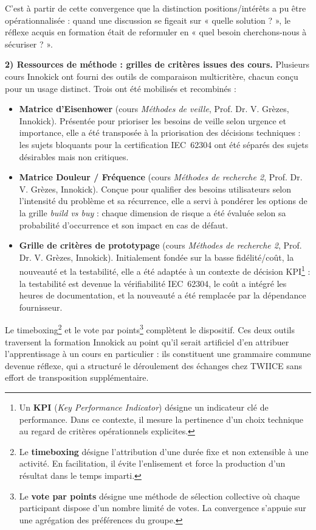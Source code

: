 C'est à partir de cette convergence que la distinction positions/intérêts a pu être opérationnalisée : quand une discussion se figeait sur « quelle solution ? », le réflexe acquis en formation était de reformuler en « quel besoin cherchons-nous à sécuriser ? ».

\textbf{2) Ressources de méthode : grilles de critères issues des cours.}
Plusieurs cours Innokick ont fourni des outils de comparaison multicritère, chacun conçu pour un usage distinct. Trois ont été mobilisés et recombinés :

\begin{itemize}
  \item \textbf{Matrice d'Eisenhower} (cours \textit{Méthodes de veille}, Prof. Dr. V. Grèzes, Innokick). Présentée pour prioriser les besoins de veille selon urgence et importance, elle a été transposée à la priorisation des décisions techniques : les sujets bloquants pour la certification IEC~62304 ont été séparés des sujets désirables mais non critiques.
  \item \textbf{Matrice Douleur / Fréquence} (cours \textit{Méthodes de recherche 2}, Prof. Dr. V. Grèzes, Innokick). Conçue pour qualifier des besoins utilisateurs selon l'intensité du problème et sa récurrence, elle a servi à pondérer les options de la grille \textit{build vs buy} : chaque dimension de risque a été évaluée selon sa probabilité d'occurrence et son impact en cas de défaut.
  \item \textbf{Grille de critères de prototypage} (cours \textit{Méthodes de recherche 2}, Prof. Dr. V. Grèzes, Innokick). Initialement fondée sur la basse fidélité/coût, la nouveauté et la testabilité, elle a été adaptée à un contexte de décision KPI\footnote{Un \textbf{KPI} (\textit{Key Performance Indicator}) désigne un indicateur clé de performance. Dans ce contexte, il mesure la pertinence d'un choix technique au regard de critères opérationnels explicites.} : la testabilité est devenue la vérifiabilité IEC~62304, le coût a intégré les heures de documentation, et la nouveauté a été remplacée par la dépendance fournisseur.
\end{itemize}

Le timeboxing\footnote{Le \textbf{timeboxing} désigne l'attribution d'une durée fixe et non extensible à une activité. En facilitation, il évite l'enlisement et force la production d'un résultat dans le temps imparti.} et le vote par points\footnote{Le \textbf{vote par points} désigne une méthode de sélection collective où chaque participant dispose d'un nombre limité de votes. La convergence s'appuie sur une agrégation des préférences du groupe.} complètent le dispositif. Ces deux outils traversent la formation Innokick au point qu'il serait artificiel d'en attribuer l'apprentissage à un cours en particulier : ils constituent une grammaire commune devenue réflexe, qui a structuré le déroulement des échanges chez TWIICE sans effort de transposition supplémentaire.

